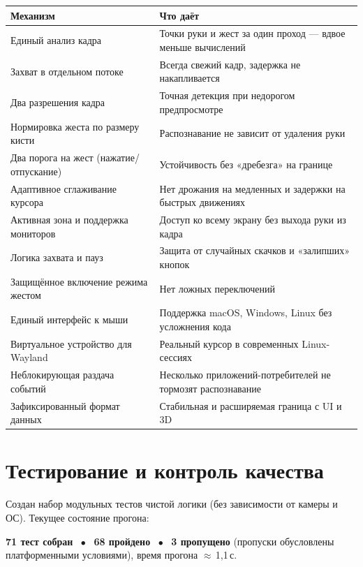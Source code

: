 \documentclass[11pt,a4paper]{article}
\newcommand{\highlight}[1]{\colorbox{accentlight}{\parbox{\dimexpr\linewidth-2\fboxsep}{#1}}}
\begin{document}
\begin{center}
\begin{longtable}{l p{8.0cm}}
\toprule
\textbf{Механизм} & \textbf{Что даёт} \\
\midrule
\endhead
Единый анализ кадра & Точки руки и жест за один проход — вдвое меньше вычислений \\
Захват в отдельном потоке & Всегда свежий кадр, задержка не накапливается \\
Два разрешения кадра & Точная детекция при недорогом предпросмотре \\
Нормировка жеста по размеру кисти & Распознавание не зависит от удаления руки \\
Два порога на жест (нажатие/отпускание) & Устойчивость без «дребезга» на границе \\
Адаптивное сглаживание курсора & Нет дрожания на медленных и задержки на быстрых движениях \\
Активная зона и поддержка мониторов & Доступ ко всему экрану без выхода руки из кадра \\
Логика захвата и пауз & Защита от случайных скачков и «залипших» кнопок \\
Защищённое включение режима жестом & Нет ложных переключений \\
Единый интерфейс к мыши & Поддержка macOS, Windows, Linux без усложнения кода \\
Виртуальное устройство для Wayland & Реальный курсор в современных Linux-сессиях \\
Неблокирующая раздача событий & Несколько приложений-потребителей не тормозят распознавание \\
Зафиксированный формат данных & Стабильная и расширяемая граница с UI и 3D \\
\bottomrule
\end{longtable}
\end{center}

\section{Тестирование и контроль качества}

Создан набор модульных тестов чистой логики (без зависимости от камеры и ОС). Текущее
состояние прогона:

\begin{center}
\highlight{\centering\textbf{71 тест собран $\;\bullet\;$ 68 пройдено $\;\bullet\;$ 3 пропущено}
(пропуски обусловлены платформенными условиями), время прогона $\approx$\,1,1\,с.}
\end{center}
\end{document}
